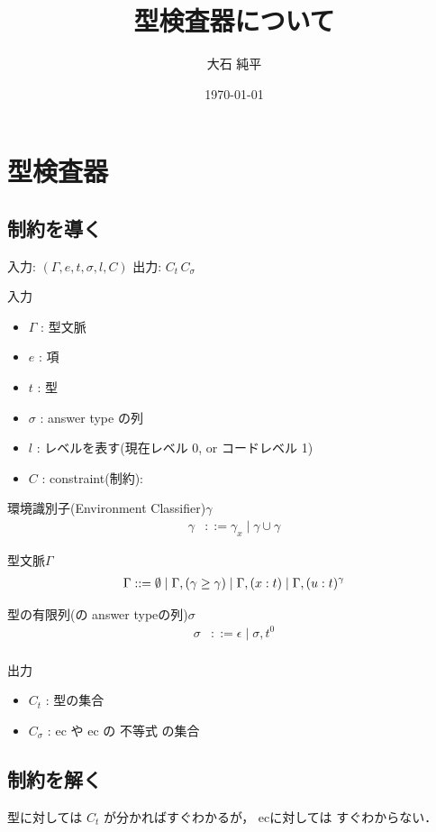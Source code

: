 \documentclass[a4j]{jsarticle}
\title{型検査器について}
\author{大石 純平}
\date{\today}
\begin{document}
\maketitle
\section{型検査器}

\subsection{制約を導く}
入力: $(\Gamma, e, t, \sigma, l, C)$
出力: $C_t \, C_{\sigma}$

入力
\begin{itemize}
\item $\Gamma$ : 型文脈
\item $e$ : 項
\item $t$ : 型
\item $\sigma$ : answer type の列
\item $l$ : レベルを表す(現在レベル 0, or コードレベル 1)
\item $C$ : constraint(制約):
\end{itemize}

環境識別子(Environment Classifier)$\gamma$
\begin{align*}
  \gamma & ::= \gamma_x \mid \gamma \cup \gamma
\end{align*}

型文脈$\Gamma$
\begin{align*}
  \Gamma ::= \emptyset
  \mid \Gamma, (\gamma \ge \gamma)
  \mid \Gamma, (x : t)
  \mid \Gamma, (u : t)^{\gamma}
\end{align*}

型の有限列(\Shiftz の answer typeの列)$\sigma$
\begin{align*}
  \sigma & ::= \epsilon \mid \sigma,t^0 \\
\end{align*}


出力
\begin{itemize}
\item $C_t$ : 型の集合
\item $C_{\sigma}$ : ec や ec の 不等式 の集合

\end{itemize}

\subsection{制約を解く}
型に対しては $C_t$ が分かればすぐわかるが，
ecに対しては すぐわからない．
\end{document}
